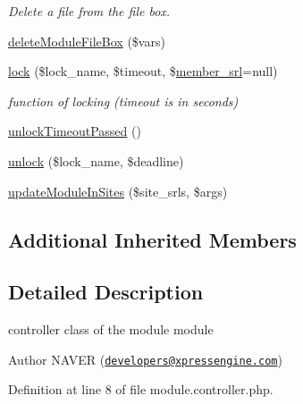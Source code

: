 \begin{DoxyCompactItemize}
\begin{DoxyCompactList}\small\item\em Delete a file from the file box. \end{DoxyCompactList}\item 
\hyperlink{classmoduleController_a26ff8a052af05f873237f3023e3e1bde}{delete\+Module\+File\+Box} (\$vars)
\item 
\hyperlink{classmoduleController_a1395c1be0ebed50078212640fba409be}{lock} (\$lock\+\_\+name, \$timeout, \$\hyperlink{ko_8install_8php_aa61f9e08f0fe505094d26f8143f30bbd}{member\+\_\+srl}=null)
\begin{DoxyCompactList}\small\item\em function of locking (timeout is in seconds) \end{DoxyCompactList}\item 
\hyperlink{classmoduleController_aac97ab294279631cb3cf1078063e8b56}{unlock\+Timeout\+Passed} ()
\item 
\hyperlink{classmoduleController_a79a5d8ecb0bc6186756e80144cbca92f}{unlock} (\$lock\+\_\+name, \$deadline)
\item 
\hyperlink{classmoduleController_a1d2d1c0845ee050c4f837dea9b9beab1}{update\+Module\+In\+Sites} (\$site\+\_\+srls, \$args)
\end{DoxyCompactItemize}
\subsection*{Additional Inherited Members}


\subsection{Detailed Description}
controller class of the module module 

\begin{DoxyAuthor}{Author}
N\+A\+V\+E\+R (\href{mailto:developers@xpressengine.com}{\tt developers@xpressengine.\+com}) 
\end{DoxyAuthor}


Definition at line 8 of file module.\+controller.\+php.



